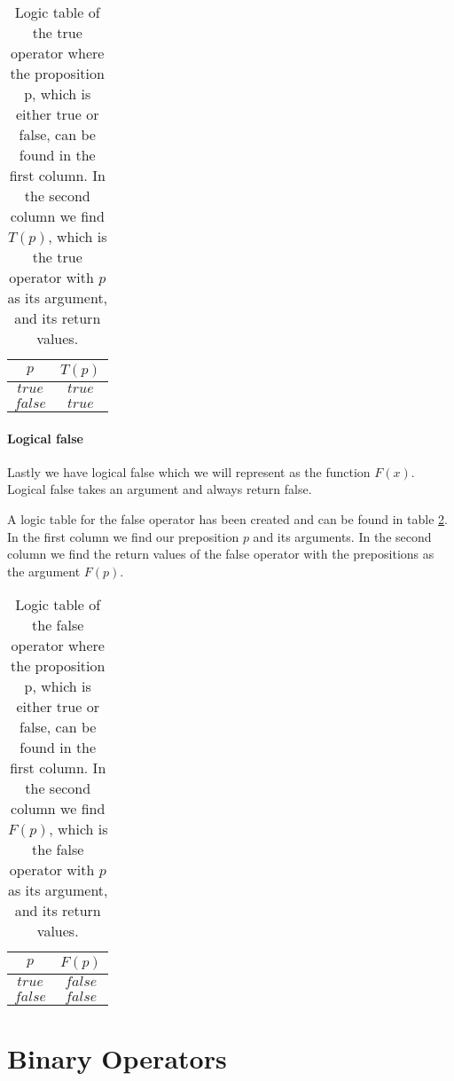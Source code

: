         \begin{table}[h!]
            \centering
            \begin{tabular}{|c|c|}
            	\hline
            	  $p$   & $T(p)$ \\ \hline
            	$true$  & $true$ \\ \hline
            	$false$ & $true$ \\ \hline
            \end{tabular}
            \caption{Logic table of the true operator where the proposition p, which is either true or false, can be found in the first column. In the second column we find $T(p)$, which is the true operator with $p$ as its argument, and its return values.}
            \label{LogicTable:True}
        \end{table}
    
    \subsubsection{Logical false}
        
        Lastly we have logical false which we will represent as the function $F(x)$. Logical false takes an argument and always return false.
        
        A logic table for the false operator has been created and can be found in table \ref{LogicTable:False}. In the first column we find our preposition $p$ and its arguments. In the second column we find the return values of the false operator with the prepositions as the argument $F(p)$.
        
        \begin{table}[h!]
            \centering
            \begin{tabular}{|c|c|}
            	\hline
            	  $p$   & $F(p)$  \\ \hline
            	$true$  & $false$ \\ \hline
            	$false$ & $false$ \\ \hline
            \end{tabular}
            \caption{Logic table of the false operator where the proposition p, which is either true or false, can be found in the first column. In the second column we find $F(p)$, which is the false operator with $p$ as its argument, and its return values.}
            \label{LogicTable:False}
    \end{table}

\chapter{Binary Operators}
\label{appendix:Binaray_Operators}
